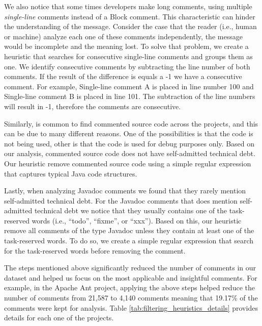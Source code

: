 We also notice that some times developers make long comments, using multiple \emph{single-line} comments instead of a Block comment. This characteristic can hinder the understanding of the message. Consider the case that the reader (i.e., human or machine) analyze each one of these comments independently, the message would be incomplete and the meaning lost. To solve that problem, we create a heuristic that searches for consecutive single-line comments and groups them as one. We identify consecutive comments by subtracting the line number of both comments. If the result of the difference is equals a -1 we have a consecutive comment. For example, Single-line comment A is placed in line number 100 and Single-line comment B is placed in line 101. The subtraction of the line numbers will result in -1, therefore the comments are consecutive.
 
Similarly, is common to find commented source code across the projects, and this can be due to many different reasons. One of the possibilities is that the code is not being used, other is that the code is used for debug purposes only. Based on our analysis, commented source code does not have self-admitted technical debt. Our heuristic remove commented source code using a simple regular expression that captures typical Java code structures.

Lastly, when analyzing Javadoc comments we found that they rarely mention self-admitted technical debt. For the Javadoc comments that does mention self-admitted technical debt we notice that they usually contains one of the task-reserved words (i.e., ``todo'', ``fixme'', or ``xxx''). Based on this, our heuristic remove all comments of the type Javadoc unless they contain at least one of the task-reserved words. To do so, we create a simple regular expression that search for the task-reserved words before removing the comment.  

The steps mentioned above significantly reduced the number of comments in our dataset and helped us focus on the most applicable and insightful comments. For example, in the Apache Ant project, applying the above steps helped reduce the number of comments from 21,587 to 4,140 comments meaning that 19.17\% of the comments were kept for analysis. Table \ref{tab:filtering_heuristics_details} provides details for each one of the projects.

